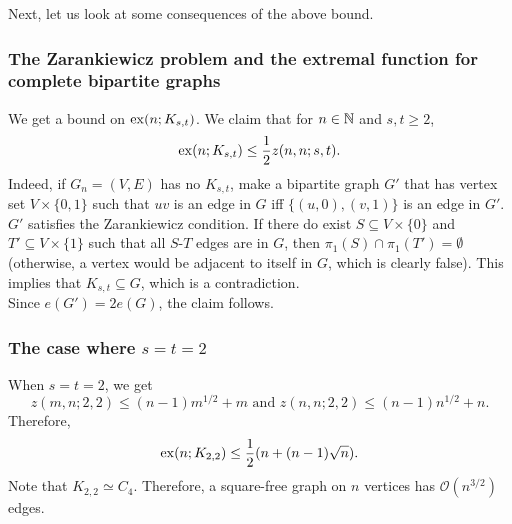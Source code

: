 		Next, let us look at some consequences of the above bound.

		\subsubsection{The Zarankiewicz problem and the extremal function for complete bipartite graphs}

			We get a bound on $\operatorname{ex}(n;K_{s,t})$. We claim that for $n\in\mathbb{N}$ and $s,t\ge 2$,
			\begin{equation}
				\label{eqn: exx n Kst and z n n s t}
				\operatorname{ex}(n;K_{s,t}) \le \frac{1}{2} z(n,n;s,t).
			\end{equation}
			Indeed, if $G_n = (V,E)$ has no $K_{s,t}$, make a bipartite graph $G'$ that has vertex set $V \times \{0,1\}$ such that $uv$ is an edge in $G$ iff $\{(u,0),(v,1)\}$ is an edge in $G'$.\\
			$G'$ satisfies the Zarankiewicz condition. If there do exist $S \subseteq V\times\{0\}$ and $T' \subseteq V \times \{1\}$ such that all $S$-$T$ edges are in $G$, then $\pi_1(S) \cap \pi_1(T') = \emptyset$ (otherwise, a vertex would be adjacent to itself in $G$, which is clearly false). This implies that $K_{s,t} \subseteq G$, which is a contradiction.\\
			Since $e(G') = 2e(G)$, the claim follows.

		\subsubsection{The case where \texorpdfstring{$s=t=2$}{s=t=2}}

			When $s=t=2$, we get
			\[ z(m,n;2,2) \le (n-1)m^{1/2} + m \text{ and } z(n,n;2,2) \le (n-1)n^{1/2} + n. \]
			Therefore,
			\[ \operatorname{ex}(n;K_{2,2}) \le \frac{1}{2} (n + (n-1)\sqrt{n}). \]
			Note that $K_{2,2}\simeq C_4$. Therefore, a square-free graph on $n$ vertices has $\mathcal{O}(n^{3/2})$ edges.\\

